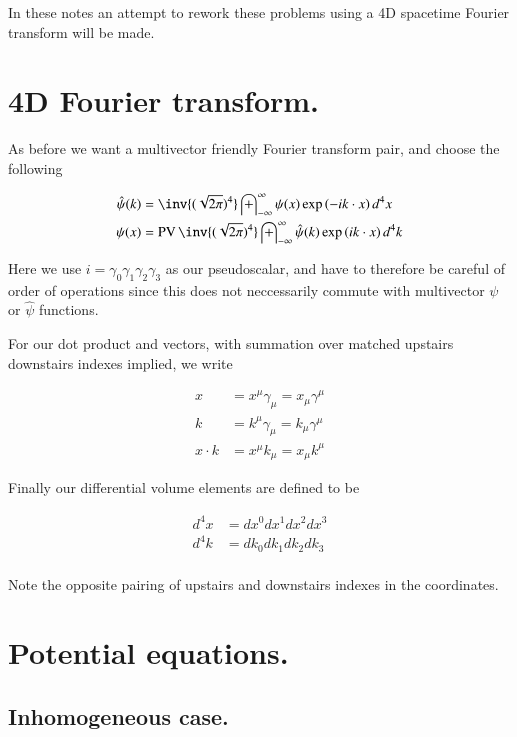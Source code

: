 \documentclass{article}
\DeclareMathOperator{\PV}{PV}
\newcommand{\IIinf}[0]{ \int_{-\infty}^\infty }
\begin{document}
In these notes an attempt to rework these problems using a 4D spacetime Fourier transform will be made.

\section{ 4D Fourier transform. }

As before we want a multivector friendly Fourier transform pair, and choose the following

\begin{align}\label{eqn:FourierTxDefinition}
\hat{\psi}(k) &= \inv{(\sqrt{2\pi})^4} \IIinf \psi(x) \exp\left( -i k \cdot x \right) d^4 x \\
{\psi}(x) &= \PV \inv{(\sqrt{2\pi})^4} \IIinf \hat{\psi}(k) \exp\left( i k \cdot x \right) d^4 k
\end{align}

Here we use $i = \gamma_0 \gamma_1 \gamma_2 \gamma_3$ as our pseudoscalar, and have to therefore be careful of order
of operations since this does not neccessarily commute with multivector $\psi$ or $\hat{\psi}$ functions.

For our dot product and vectors, with summation over matched upstairs downstairs indexes implied, we write

\begin{align*}
x &= x^\mu \gamma_\mu = x_\mu \gamma^\mu \\
k &= k^\mu \gamma_\mu = k_\mu \gamma^\mu \\
x \cdot k &= x^\mu k_\mu = x_\mu k^\mu
\end{align*}

Finally our differential volume elements are defined to be

\begin{align*}
d^4 x &= dx^0 dx^1 dx^2 dx^3 \\
d^4 k &= dk_0 dk_1 dk_2 dk_3 \\
\end{align*}

Note the opposite pairing of upstairs and downstairs indexes in the coordinates.

\section{ Potential equations. }

\subsection{ Inhomogeneous case. } 
\end{document}

